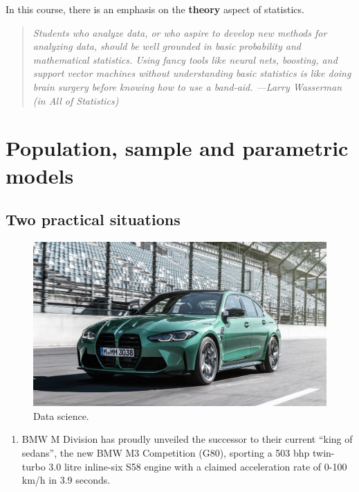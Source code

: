 \documentclass[
]{book}
\providecommand{\tightlist}{%
  \setlength{\itemsep}{0pt}\setlength{\parskip}{0pt}}
\theoremstyle{definition}
\theoremstyle{definition}
\theoremstyle{definition}
\theoremstyle{definition}
\theoremstyle{remark}
\begin{document}
In this course, there is an emphasis on the \textbf{theory} aspect of statistics.

\begin{quote}
\emph{Students who analyze data, or who aspire to develop new methods for analyzing data, should be well grounded in basic probability and mathematical statistics. Using fancy tools like neural nets, boosting, and support vector machines without understanding basic statistics is like doing brain surgery before knowing how to use a band-aid. ---Larry Wasserman (in All of Statistics)}
\end{quote}

\hypertarget{population-sample-and-parametric-models}{%
\section*{Population, sample and parametric models}\label{population-sample-and-parametric-models}}

\hypertarget{two-practical-situations}{%
\subsection*{Two practical situations}\label{two-practical-situations}}

\begin{figure}

{\centering \includegraphics[width=0.6\linewidth]{figure/00-g80} 

}

\caption{Data science.}\label{fig:bmwm3}
\end{figure}

\begin{enumerate}
\def\labelenumi{\arabic{enumi}.}
\tightlist
\item
  BMW M Division has proudly unveiled the successor to their current ``king of sedans'', the new BMW M3 Competition (G80), sporting a 503 bhp twin-turbo 3.0 litre inline-six S58 engine with a claimed acceleration rate of 0-100 km/h in 3.9 seconds.
\end{enumerate}
\end{document}
